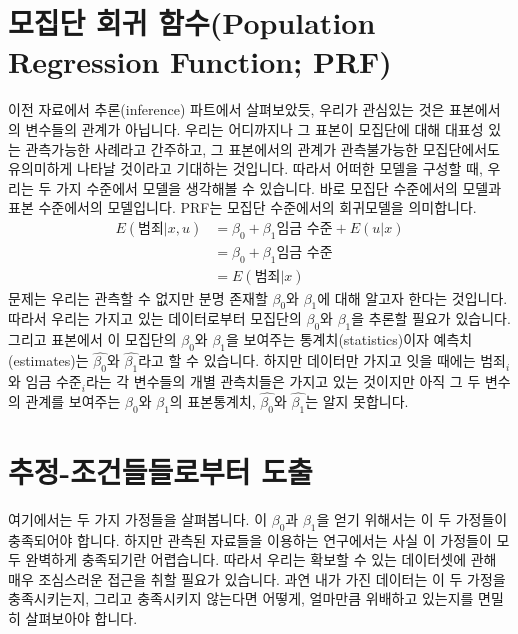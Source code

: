 \documentclass[
]{book}
\begin{document}
\hypertarget{uxbaa8uxc9d1uxb2e8-uxd68cuxadc0-uxd568uxc218population-regression-function-prf}{%
\section{모집단 회귀 함수(Population Regression Function; PRF)}\label{uxbaa8uxc9d1uxb2e8-uxd68cuxadc0-uxd568uxc218population-regression-function-prf}}

이전 자료에서 추론(inference) 파트에서 살펴보았듯, 우리가 관심있는 것은 표본에서의 변수들의 관계가 아닙니다. 우리는 어디까지나 그 표본이 모집단에 대해 대표성 있는 관측가능한 사례라고 간주하고, 그 표본에서의 관계가 관측불가능한 모집단에서도 유의미하게 나타날 것이라고 기대하는 것입니다. 따라서 어떠한 모델을 구성할 때, 우리는 두 가지 수준에서 모델을 생각해볼 수 있습니다. 바로 모집단 수준에서의 모델과 표본 수준에서의 모델입니다. PRF는 모집단 수준에서의 회귀모델을 의미합니다.
\begin{equation*}
\begin{aligned}
E(\text{범죄}|x, u)&= \beta_0 + \beta_1\text{임금 수준} + E(u|x)\\
&=\beta_0 + \beta_1\text{임금 수준}\\
&=E(\text{범죄}|x)
\end{aligned}
\end{equation*}
문제는 우리는 관측할 수 없지만 분명 존재할 \(\beta_0\)와 \(\beta_1\)에 대해 알고자 한다는 것입니다. 따라서 우리는 가지고 있는 데이터로부터 모집단의 \(\beta_0\)와 \(\beta_1\)을 추론할 필요가 있습니다. 그리고 표본에서 이 모집단의 \(\beta_0\)와 \(\beta_1\)을 보여주는 통계치(statistics)이자 예측치(estimates)는 \(\hat{\beta_0}\)와 \(\hat{\beta_1}\)라고 할 수 있습니다. 하지만 데이터만 가지고 잇을 때에는 \(\text{범죄}_i\)와 \(\text{임금 수준}_i\)라는 각 변수들의 개별 관측치들은 가지고 있는 것이지만 아직 그 두 변수의 관계를 보여주는 \(\beta_0\)와 \(\beta_1\)의 표본통계치, \(\hat{\beta_0}\)와 \(\hat{\beta_1}\)는 알지 못합니다.

\hypertarget{uxcd94uxc815-uxc870uxac74uxb4e4uxb4e4uxb85cuxbd80uxd130-uxb3c4uxcd9c}{%
\section{추정-조건들들로부터 도출}\label{uxcd94uxc815-uxc870uxac74uxb4e4uxb4e4uxb85cuxbd80uxd130-uxb3c4uxcd9c}}

여기에서는 두 가지 가정들을 살펴봅니다. 이 \(\beta_0\)과 \(\beta_1\)을 얻기 위해서는 이 두 가정들이 충족되어야 합니다. 하지만 관측된 자료들을 이용하는 연구에서는 사실 이 가정들이 모두 완벽하게 충족되기란 어렵습니다. 따라서 우리는 확보할 수 있는 데이터셋에 관해 매우 조심스러운 접근을 취할 필요가 있습니다. 과연 내가 가진 데이터는 이 두 가정을 충족시키는지, 그리고 충족시키지 않는다면 어떻게, 얼마만큼 위배하고 있는지를 면밀히 살펴보아야 합니다.
\end{document}
